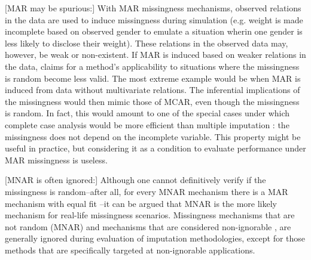 \documentclass[bimj,fleqn]{w-art}
\begin{document}
[MAR may be spurious:] With MAR missingness mechanisms, observed relations in the data are used to induce missingness during simulation (e.g. weight is made incomplete based on observed gender to emulate a situation wherin one gender is less likely to disclose their weight). These relations in the observed data may, however, be weak or non-existent. If MAR is induced based on weaker relations in the data, claims for a method's applicability to situations where the missingness is random become less valid. The most extreme example would be when MAR is induced from data without multivariate relations. The inferential implications of the missingness would then mimic those of MCAR, even though the missingness is random. In fact, this would amount to one of the special cases under which complete case analysis would be more efficient than multiple imputation \citep[see e.g.][p. 48]{fimd}: the missingness does not depend on the incomplete variable. This property might be useful in practice, but considering it as a condition to evaluate performance under MAR missingness is useless. %



[MNAR is often ignored:] Although one cannot definitively verify if the missingness is random--after all, for every MNAR mechanism there is a MAR mechanism with equal fit \citep{molenberghs2008every}--it can be argued that MNAR is the more likely mechanism for real-life missingness scenarios. Missingness mechanisms that are not random (MNAR) and mechanisms that are considered non-ignorable \citep[see e.g.][]{rubi76}, are generally ignored during evaluation of imputation methodologies, except for those methods that are specifically targeted at non-ignorable applications.  %
\end{document}
